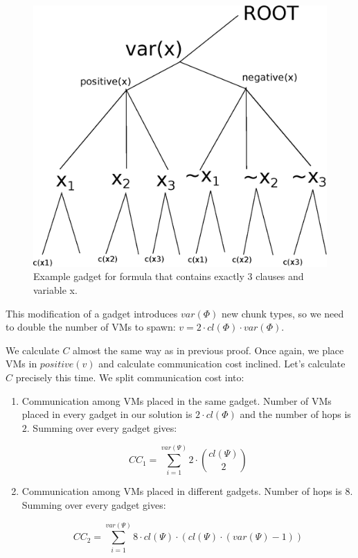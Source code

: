 \begin{figure}[htbp]
\includegraphics[width = \columnwidth]{figs/gadget-new.eps}
\caption{Example gadget for formula that contains exactly 3 clauses
and variable x.}
\label{fig:gadgets}
\end{figure}

This modification of a gadget introduces
$var(\Phi)$ new chunk types, so we need to double the number of VMs to
spawn: $v = 2 \cdot cl(\Phi)\cdot var(\Phi)$.

We calculate $C$ almost the same way as in previous proof. Once again,
we place VMs in $positive(v)$ and calculate communication cost
inclined. Let's calculate $C$ precisely this time. We split
communication cost into:
\begin{enumerate}
\item Communication among VMs placed in the same gadget. Number of VMs
placed in every gadget in our solution is $2\cdot cl(\Phi)$ and the
number of hops is $2$. Summing over every gadget gives:

$$ CC_1 = \sum_{i=1}^{var(\Psi)}2\cdot {cl(\Psi) \choose 2} $$

\item Communication among VMs placed in different gadgets. Number of
hops is $8$. Summing over every gadget gives:

$$ CC_2 = \sum_{i=1}^{var(\Psi)} 8 \cdot cl(\Psi) \cdot (cl(\Psi) \cdot (var(\Psi) - 1))$$
\end{enumerate}

